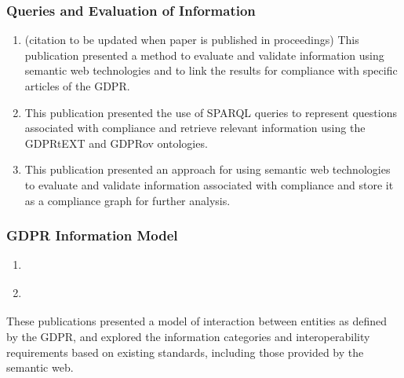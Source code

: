 \subsubsection{Queries and Evaluation of Information}
\begin{enumerate}[resume]
    \item \textbf{} (citation to be updated when paper is published in proceedings)
        \newline
        This publication presented a method to evaluate and validate information using semantic web technologies and to link the results for compliance with specific articles of the GDPR.
    \item \textbf{}
        \newline
        This publication presented the use of SPARQL queries to represent questions associated with compliance and retrieve relevant information using the GDPRtEXT and GDPRov ontologies.
    \item \textbf{}
        \newline
        This publication presented an approach for using semantic web technologies to evaluate and validate information associated with compliance and store it as a compliance graph for further analysis.
\end{enumerate}

\subsubsection{GDPR Information Model}
\begin{enumerate}[resume]
    \item \textbf{}
    \item \textbf{}
\end{enumerate}
These publications presented a model of interaction between entities as defined by the GDPR, and explored the information categories and interoperability requirements based on existing standards, including those provided by the semantic web.

